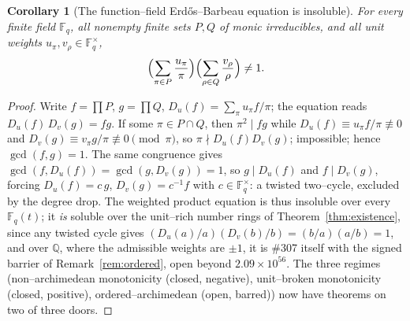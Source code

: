 \documentclass[11pt]{article}
\newtheorem{corollary}[theorem]{Corollary}
\theoremstyle{definition}
\begin{document}
\begin{corollary}[The function--field Erd\H{o}s--Barbeau equation is insoluble]\label{cor:ff307}
For every finite field $\mathbb{F}_q$, all nonempty finite sets $P,Q$ of monic irreducibles, and all
unit weights $u_\pi,v_\rho\in\mathbb{F}_q^\times$,
\[
\Bigl(\sum_{\pi\in P}\frac{u_\pi}{\pi}\Bigr)\Bigl(\sum_{\rho\in Q}\frac{v_\rho}{\rho}\Bigr)\ne1.
\]
\end{corollary}
\begin{proof}
Write $f=\prod P$, $g=\prod Q$, $D_u(f)=\sum_\pi u_\pi f/\pi$; the equation reads $D_u(f)\,D_v(g)=fg$.
If some $\pi\in P\cap Q$, then $\pi^2\mid fg$ while $D_u(f)\equiv u_\pi f/\pi\not\equiv0$ and
$D_v(g)\equiv v_\pi g/\pi\not\equiv0\pmod\pi$, so $\pi\nmid D_u(f)D_v(g)$; impossible; hence
$\gcd(f,g)=1$. The same congruence gives $\gcd(f,D_u(f))=\gcd(g,D_v(g))=1$, so $g\mid D_u(f)$ and
$f\mid D_v(g)$, forcing $D_u(f)=c\,g$, $D_v(g)=c^{-1}f$ with $c\in\mathbb{F}_q^\times$: a twisted
two--cycle, excluded by the degree drop. The weighted product equation is thus insoluble over every
$\mathbb{F}_q(t)$; it \emph{is} soluble over the unit--rich number rings of
Theorem~\ref{thm:existence}, since any twisted cycle gives $(D_u(a)/a)(D_v(b)/b)=(b/a)(a/b)=1$, and over
$\mathbb{Q}$, where the admissible weights are $\pm1$, it is \#307 itself with the signed barrier of
Remark~\ref{rem:ordered}, open beyond $2.09\times10^{56}$. The three regimes (non--archimedean
monotonicity (closed, negative), unit--broken monotonicity (closed, positive), ordered--archimedean
(open, barred)) now have theorems on two of three doors.
\end{proof}
\end{document}
